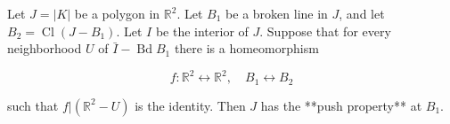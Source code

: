 Let $J = |K|$ be a polygon in $\mathbb{R}^2$. Let $B_1$ be a broken line in $J$, and let $B_2 = \operatorname{Cl}(J - B_1)$. Let $I$ be the interior of $J$. Suppose that for every neighborhood $U$ of $\bar{I} - \operatorname{Bd} B_1$ there is a homeomorphism

$$f: \mathbb{R}^2 \leftrightarrow \mathbb{R}^2, \quad B_1 \leftrightarrow B_2$$

such that $f|(\mathbb{R}^2 - U)$ is the identity. Then $J$ has the **push property** at $B_1$.
